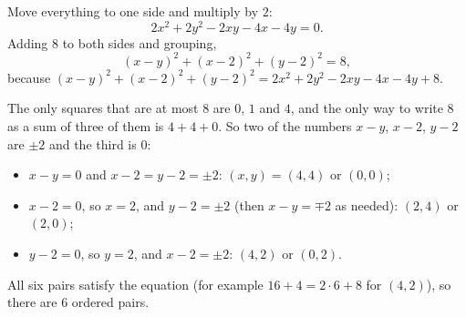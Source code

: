 Move everything to one side and multiply by $2$:
\[2x^2+2y^2-2xy-4x-4y=0.\]
Adding $8$ to both sides and grouping,
\[(x-y)^2+(x-2)^2+(y-2)^2=8,\]
because $(x-y)^2+(x-2)^2+(y-2)^2=2x^2+2y^2-2xy-4x-4y+8$.

The only squares that are at most $8$ are $0$, $1$ and $4$, and the only way to write $8$ as a sum of three of them is $4+4+0$. So two of the numbers $x-y$, $x-2$, $y-2$ are $\pm2$ and the third is $0$:
\begin{itemize}
\item $x-y=0$ and $x-2=y-2=\pm2$: $(x,y)=(4,4)$ or $(0,0)$;
\item $x-2=0$, so $x=2$, and $y-2=\pm2$ (then $x-y=\mp2$ as needed): $(2,4)$ or $(2,0)$;
\item $y-2=0$, so $y=2$, and $x-2=\pm2$: $(4,2)$ or $(0,2)$.
\end{itemize}
All six pairs satisfy the equation (for example $16+4=2\cdot6+8$ for $(4,2)$), so there are $\boxed{6}$ ordered pairs.
